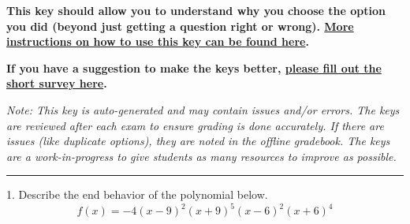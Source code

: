 \documentclass{extbook}[14pt]
\begin{document}
\textbf{This key should allow you to understand why you choose the option you did (beyond just getting a question right or wrong). \href{https://xronos.clas.ufl.edu/mac1105spring2020/courseDescriptionAndMisc/Exams/LearningFromResults}{More instructions on how to use this key can be found here}.}

\textbf{If you have a suggestion to make the keys better, \href{https://forms.gle/CZkbZmPbC9XALEE88}{please fill out the short survey here}.}

\textit{Note: This key is auto-generated and may contain issues and/or errors. The keys are reviewed after each exam to ensure grading is done accurately. If there are issues (like duplicate options), they are noted in the offline gradebook. The keys are a work-in-progress to give students as many resources to improve as possible.}

\rule{\textwidth}{0.4pt}

1. Describe the end behavior of the polynomial below.
\[ f(x) = -4(x - 9)^{2}(x + 9)^{5}(x - 6)^{2}(x + 6)^{4} \] 
\end{document}
